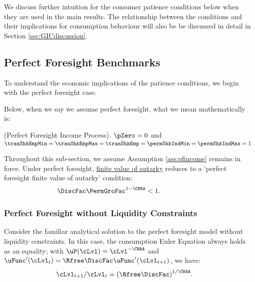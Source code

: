 \documentclass[BufferStockTheory]{subfiles}
\begin{document}
We discuss further intuition for the consumer patience conditions below when they are used in the main results. 
The relationship between the conditions and their implications for consumption behaviour will also be be discussed in detail in Section \ref{sec:GICdiscussion}.

\hypertarget{Perfect-Foresight-Benchmarks}{}
\subsection{Perfect Foresight Benchmarks}\label{subsec:PFBbenchmark}
To understand the economic implications of the patience conditions, we begin with the perfect foresight case.

Below, when we say we assume perfect foresight, what we mean mathematically is:
%
\begin{assumI}\label{ass:pfincome}(Perfect Foresight Income Process).
$\pZero=0$ and $\tranShkEmpMin=\tranShkEmpMax=\bar{\tranShkEmp}=\permShkIndMin=\permShkIndMax=1$
\end{assumI}

Throughout this sub-section, we assume Assumption \ref{ass:pfincome} remains in force. 
%
Under perfect foresight,  \hyperlink{FVAC}{finite value of autarky} reduces to a `perfect foresight finite value of autarky' condition: 
%
\hypertarget{PFFVAC}{}
\begin{equation}\begin{gathered}\begin{aligned}  
         \DiscFac \PermGroFac^{1-\CRRA}  & <  1.  \phantom{\text{\PFFVAC:~~}}
\end{aligned}\end{gathered}\label{eq:PFFVAC}\end{equation}


\subsubsection{Perfect Foresight without Liquidity Constraints}\label{subsubsec:PFUncon}


Consider the familiar analytical solution to the perfect foresight model without liquidity constraints.
In this case, the consumption Euler Equation always holds as an equality; with $\uP(\cLvl)=\cLvl^{-\CRRA}$ and $\uFunc^{\prime}(\cLvl_{t})=\Rfree\DiscFac\uFunc^{\prime}(\cLvl_{t+1})$, we have:
%
%
\begin{align}
  \cLvl_{t+1}/\cLvl_{t}  & = {(\Rfree\DiscFac)}^{1/\CRRA}. \label{eq:cGroFac}
\end{align} 
%
\end{document}
